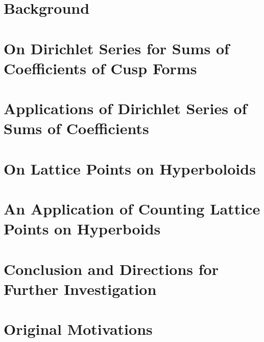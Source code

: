 \documentclass[12pt]{report}   %
\theoremstyle{definition}
\begin{document}
\chapter{Background}\label{c:background}

\clearpage{\pagestyle{empty}\cleardoublepage}

\chapter{On Dirichlet Series for Sums of Coefficients of Cusp Forms}\label{c:sums}

\clearpage{\pagestyle{empty}\cleardoublepage}

\chapter{Applications of Dirichlet Series of Sums of Coefficients}\label{c:sums_apps}

\clearpage{\pagestyle{empty}\cleardoublepage}

\chapter{On Lattice Points on Hyperboloids}\label{c:hyperboloid}

\clearpage{\pagestyle{empty}\cleardoublepage}

\chapter{An Application of Counting Lattice Points on Hyperboids}\label{c:hyperboloid_apps}

\clearpage{\pagestyle{empty}\cleardoublepage}

\chapter{Conclusion and Directions for Further Investigation}\label{c:conclusion}

\clearpage{\pagestyle{empty}\cleardoublepage}

\chapter{Original Motivations}\label{c:motivations}

\clearpage{\pagestyle{empty}\cleardoublepage}

%
\end{document}
